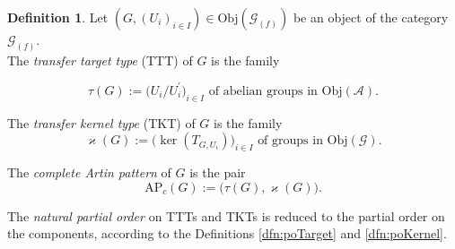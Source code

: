 \documentclass{amsart}
\theoremstyle{definition}
\newtheorem{definition}{Definition}[section]
\numberwithin{equation}{section}
\begin{document}
\begin{definition}
\label{dfn:FullArtinPattern}
Let \((G,(U_i)_{i\in I})\in\mathrm{Obj}(\mathcal{G}_{(f)})\)
be an object of the category \(\mathcal{G}_{(f)}\).\\
The \textit{transfer target type} (TTT) of \(G\) is the family

\begin{equation}
\label{eqn:TTT}
\tau(G):=\bigl(U_i/U_i^\prime\bigr)_{i\in I} \text{ of abelian groups in }\mathrm{Obj}(\mathcal{A}).
\end{equation}

\noindent
The \textit{transfer kernel type} (TKT) of \(G\) is the family
\begin{equation}
\label{eqn:TKT}
\varkappa(G):=\bigl(\ker(T_{G,U_i})\bigr)_{i\in I} \text{ of groups in }\mathrm{Obj}(\mathcal{G}).
\end{equation}

\noindent
The \textit{complete Artin pattern} of \(G\) is the pair
\begin{equation}
\label{eqn:FullArtinPattern}
\mathrm{AP}_c(G):=\bigl(\tau(G),\varkappa(G)\bigr).
\end{equation}

\end{definition}


The \textit{natural partial order} on TTTs and TKTs is reduced to
the partial order on the components, according to the Definitions
\ref{dfn:poTarget}
and
\ref{dfn:poKernel}.
\end{document}
